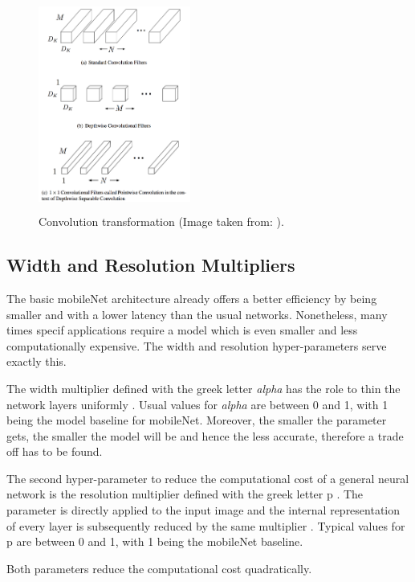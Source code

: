 \begin{figure}[!htbp]
\begin{center}
\includegraphics[width=5cm,height=7cm,keepaspectratio]{images/convolutions.png}
\end{center}
\caption{Convolution transformation (Image taken from: \cite{paper:MobileNets}).}
\end{figure}

\subsection{Width and Resolution Multipliers}

The basic mobileNet architecture already offers a better efficiency by being smaller and with a lower latency than the usual networks. Nonetheless, many times specif applications require a model which is even smaller and less computationally expensive. The width and resolution hyper-parameters serve exactly this.

The  width multiplier defined with the greek letter \textit{alpha} has the role to thin the network layers uniformly \cite{paper:MobileNets}. Usual values for \textit{alpha} are between 0 and 1, with 1 being the model baseline for mobileNet. Moreover, the smaller the parameter gets, the smaller the model will be and hence the less accurate, therefore a trade off has to be found.

The second hyper-parameter to reduce the computational cost of a general neural network is the resolution multiplier defined with the greek letter p \cite{paper:MobileNets}. The parameter is directly applied to the input image and the internal representation of every layer is subsequently reduced by the same multiplier \cite{paper:MobileNets}. Typical values for p are between 0 and 1, with 1 being the mobileNet baseline.

Both parameters reduce the computational cost quadratically.

